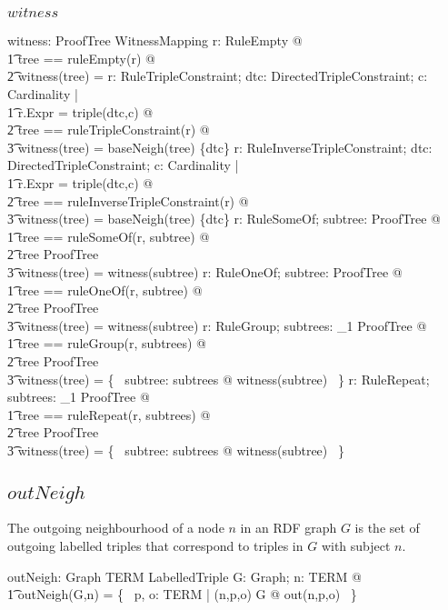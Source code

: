 \documentclass{article}
\begin{document}
\subsubsection{$witness$}
\begin{axdef}
	witness: ProofTree \fun WitnessMapping
\where
	\forall r: RuleEmpty @ \\
\t1		\LET tree == ruleEmpty(r) @ \\
\t2		witness(tree) = \emptyset
\also
	\forall r: RuleTripleConstraint; dtc: DirectedTripleConstraint; c: Cardinality | \\
\t1		r.Expr = triple(dtc,c) @ \\
\t2			\LET tree == ruleTripleConstraint(r) @ \\
\t3				witness(tree) = baseNeigh(tree) \cross \{dtc\}
\also
	\forall r: RuleInverseTripleConstraint; dtc: DirectedTripleConstraint; c: Cardinality | \\
\t1		r.Expr = triple(dtc,c) @ \\
\t2			\LET tree == ruleInverseTripleConstraint(r) @ \\
\t3				witness(tree) = baseNeigh(tree) \cross \{dtc\}
\also
	\forall r: RuleSomeOf; subtree: ProofTree @ \\
\t1		\LET tree == ruleSomeOf(r, subtree) @ \\
\t2			tree \in ProofTree \implies \\
\t3				witness(tree) = witness(subtree)
\also
	\forall r: RuleOneOf; subtree: ProofTree @ \\
\t1		\LET tree == ruleOneOf(r, subtree) @ \\
\t2			tree \in ProofTree \implies \\
\t3				witness(tree) = witness(subtree)
\also
	\forall r: RuleGroup; subtrees: \seq_1 ProofTree @ \\
\t1		\LET tree == ruleGroup(r, subtrees) @ \\
\t2			tree \in ProofTree \implies \\
\t3				witness(tree) = \bigcup \{~ subtree: \ran subtrees @ witness(subtree) ~\}
\also
	\forall r: RuleRepeat; subtrees: \seq_1 ProofTree @ \\
\t1		\LET tree == ruleRepeat(r, subtrees) @ \\
\t2			tree \in ProofTree \implies \\
\t3				witness(tree) = \bigcup \{~ subtree: \ran subtrees @ witness(subtree) ~\}
\end{axdef}

\subsection{$outNeigh$}
The outgoing neighbourhood of a node $n$ in an RDF graph $G$ is the set of outgoing labelled triples that correspond to triples
in $G$ with subject $n$.
\begin{axdef}
	outNeigh: Graph \cross TERM \fun \finset LabelledTriple
\where
	\forall G: Graph; n: TERM @ \\
\t1		outNeigh(G,n) = \{~ p, o: TERM | (n,p,o) \in G @ out(n,p,o) ~\}
\end{axdef}
\end{document}
